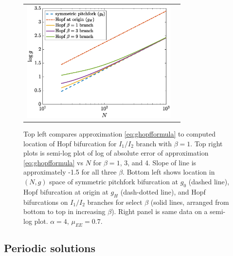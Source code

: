 \documentclass[reqno]{siamonline190516}
\begin{document}
\begin{figure}
\begin{tabular}{cc}
    \includegraphics[width=7.8cm]{images/HopflogNvsgsemilog.eps}
    \end{tabular}
    \caption{Top left compares approximation \cref{eq:ghopfformula} to computed location of Hopf bifurcation for $I_1/I_2$ branch with $\beta = 1$. Top right plots is semi-log plot of log of absolute error of approximation \cref{eq:ghopfformula} vs $N$ for $\beta = 1$, 3, and 4. Slope of line is approximately -1.5 for all three $\beta$. Bottom left shows location in $(N, g)$ space of symmetric pitchfork bifurcation at $g_0$ (dashed line), Hopf bifurcation at origin at $g_H$ (dash-dotted line), and Hopf bifurcations on $I_1/I_2$ branches for select $\beta$ (solid lines, arranged from bottom to top in increasing $\beta$). Right panel is same data on a semi-log plot. $\alpha = 4$, $\mu_{EE}= 0.7$. }
    \label{fig:Hopfplots}
\end{figure}


\subsection{Periodic solutions}\label{sec:periodic}
\end{document}
